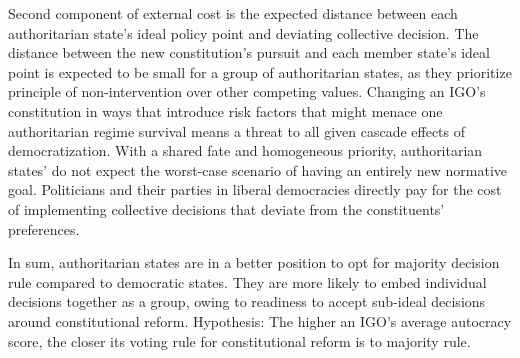 \documentclass[12pt]{article}
\begin{document}
Second component of external cost is the expected distance between each authoritarian state’s ideal policy point and deviating collective decision. The distance between the new constitution’s pursuit and each member state’s ideal point is expected to be small for a group of authoritarian states, as they prioritize principle of non-intervention over other competing values. Changing an IGO’s constitution in ways that introduce risk factors that might menace one authoritarian regime survival means a threat to all given cascade effects of democratization. With a shared fate and homogeneous priority, authoritarian states’ do not expect the worst-case scenario of having an entirely new normative goal. Politicians and their parties in liberal democracies directly pay for the cost of implementing collective decisions that deviate from the constituents’ preferences. 

In sum, authoritarian states are in a better position to opt for majority decision rule compared to democratic states. They are more likely to embed individual decisions together as a group, owing to readiness to accept sub-ideal decisions around constitutional reform. 
Hypothesis: The higher an IGO’s average autocracy score, the closer its voting rule for constitutional reform is to majority rule.
\end{document}
